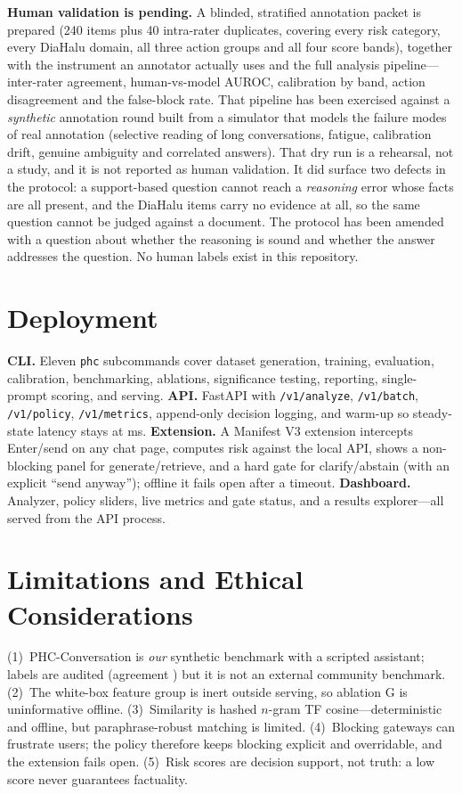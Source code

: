 \documentclass[conference,a4paper]{IEEEtran}
\begin{document}
\textbf{Human validation is pending.} A blinded, stratified annotation
packet is prepared (240 items plus 40 intra-rater duplicates, covering every
risk category, every DiaHalu domain, all three action groups and all four
score bands), together with the instrument an annotator actually uses and
the full analysis pipeline---inter-rater agreement, human-vs-model AUROC,
calibration by band, action disagreement and the false-block rate. That
pipeline has been exercised against a \emph{synthetic} annotation round
built from a simulator that models the failure modes of real annotation
(selective reading of long conversations, fatigue, calibration drift,
genuine ambiguity and correlated answers). That dry run is a rehearsal, not
a study, and it is not reported as human validation. It did surface two
defects in the protocol: a support-based question cannot reach a
\emph{reasoning} error whose facts are all present, and the DiaHalu items
carry no evidence at all, so the same question cannot be judged against a
document. The protocol has been amended with a question about whether the
reasoning is sound and whether the answer addresses the question. No human
labels exist in this repository.
\section{Deployment}
\textbf{CLI.} Eleven \texttt{phc} subcommands cover dataset generation,
training, evaluation, calibration, benchmarking, ablations, significance
testing, reporting, single-prompt scoring, and serving.
\textbf{API.} FastAPI with \texttt{/v1/analyze}, \texttt{/v1/batch},
\texttt{/v1/policy}, \texttt{/v1/metrics}, append-only decision logging, and
warm-up so steady-state latency stays at \latmedian{} ms.
\textbf{Extension.} A Manifest V3 extension intercepts Enter/send on any
chat page, computes risk against the local API, shows a non-blocking panel
for generate/retrieve, and a hard gate for clarify/abstain (with an explicit
``send anyway''); offline it fails open after a timeout.
\textbf{Dashboard.} Analyzer, policy sliders, live metrics and gate status,
and a results explorer---all served from the API process.

\section{Limitations and Ethical Considerations}
(1)~PHC-Conversation is \emph{our} synthetic benchmark with a scripted
assistant; labels are audited (agreement \agreement{}) but it is not an
external community benchmark. (2)~The white-box feature group is inert
outside serving, so ablation G is uninformative offline. (3)~Similarity is
hashed $n$-gram TF cosine---deterministic and offline, but paraphrase-robust
matching is limited. (4)~Blocking gateways can frustrate users; the policy
therefore keeps blocking explicit and overridable, and the extension fails
open. (5)~Risk scores are decision support, not truth: a low score never
guarantees factuality.
\end{document}
